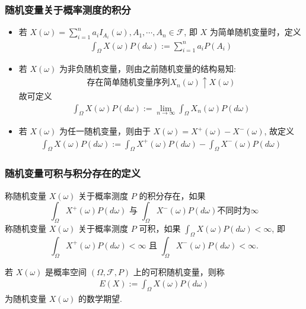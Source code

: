 	\begin{frame}
		\frametitle{随机变量关于概率测度的积分}
		\begin{itemize}[<+-|alert@+>]
			\item 若 $X (\omega)=\sum_{i=1}^{n} a_{i} I_{A_{i}}(\omega), A_1,\cdots, A_n\in\mathcal{F}$, 即 $X$ 为简单随机变量时，定义 \pause
			\begin{eqnarray*}
				\int_\Omega X(\omega)P(d\omega):=\sum_{i=1}^na_iP(A_i)
			\end{eqnarray*}
			\item 若 $X (\omega)$ 为非负随机变量，则由之前随机变量的结构易知:\pause
			\begin{eqnarray*}
				\mbox{存在简单随机变量序列} X_n (\omega)\uparrow X (\omega)
			\end{eqnarray*}
			故可定义 \pause
			\begin{eqnarray*}
				\int_\Omega X(\omega)P(d\omega):=\lim_{n\rightarrow\infty}\int_\Omega X_n(\omega)P(d\omega)
			\end{eqnarray*}
			\item 若 $X (\omega)$ 为任一随机变量，则由于 $X (\omega)=X^+(\omega)-X^-(\omega)$, 故定义 \pause
			\begin{eqnarray*}
				\int_\Omega X(\omega)P(d\omega):=\int_\Omega X^+(\omega)P(d\omega)-\int_\Omega X^-(\omega)P(d\omega)
			\end{eqnarray*}

		\end{itemize}
	\end{frame}
	\begin{frame}
		\frametitle{随机变量可积与积分存在的定义}
		\begin{defi}
			称随机变量 $X (\omega)$ 关于概率测度 $P$ 的积分存在，如果 \pause
			\[\int_\Omega X^+(\omega) P (d\omega) \mbox{ 与 }\int_\Omega X^-(\omega) P (d\omega) \mbox{不同时为}\infty\]                                                  \pause  称随机变量 $X (\omega)$ 关于概率测度 $P$ 可积，如果 \pause $\int_\Omega X (\omega) P (d\omega)<\infty$, 即 \pause
			\[\int_\Omega X^+(\omega) P (d\omega)<\infty \mbox{ 且 }\int_\Omega X^-(\omega) P (d\omega)<\infty.\]                                                         \end{defi}
		\pause
		\begin{defi}
			若 $X (\omega)$ 是概率空间 $(\Omega,\mathcal{F},P)$ 上的可积随机变量，则称
			\begin{eqnarray*}
				E(X):=\int_\Omega X(\omega)P(d\omega)
			\end{eqnarray*}
			为随机变量 $X (\omega)$ 的数学期望.
		\end{defi}
	\end{frame}
